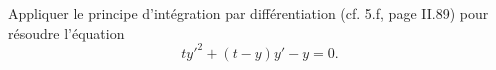 \begin{exercice}\label{exo_II-1-26}

Appliquer le principe d'intégration par différentiation (cf. 5.f, page II.89) pour résoudre l'équation
\begin{equation}
	ty'^2+(t-y)y'-y=0.
\end{equation}

\end{exercice}


